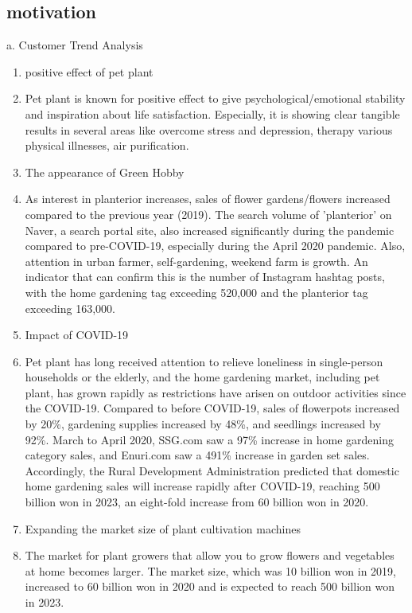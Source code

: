 \documentclass[conference, a4paper]{IEEEtran}
\begin{document}
\subsection{motivation}
a. Customer Trend Analysis
\begin{enumerate}
    \item positive effect of pet plant
    \item[] Pet plant is known for positive effect to give psychological/emotional stability and inspiration about life satisfaction. Especially, it is showing clear tangible results in several areas like overcome stress and depression, therapy various physical illnesses, air purification. \cite{ju2020} \\
    
    \item The appearance of Green Hobby
    \item[] As interest in planterior increases, sales of flower gardens/flowers increased compared to the previous year (2019). The search volume of 'planterior' on Naver, a search portal site, also increased significantly during the pandemic compared to pre-COVID-19, especially during the April 2020 pandemic. Also, attention in urban farmer, self-gardening, weekend farm is growth. An indicator that can confirm this is the number of Instagram hashtag posts, with the home gardening tag exceeding 520,000 and the planterior tag exceeding 163,000. \cite{hanaif_report} \\
    
    \item Impact of COVID-19
    \item[] Pet plant has long received attention to relieve loneliness in single-person households or the elderly, and the home gardening market, including pet plant, has grown rapidly as restrictions have arisen on outdoor activities since the COVID-19.
Compared to before COVID-19, sales of flowerpots increased by 20\%, gardening supplies increased by 48\%, and seedlings increased by 92\%. March to April 2020, SSG.com saw a 97\% increase in home gardening category sales, and Enuri.com saw a 491\% increase in garden set sales.
Accordingly, the Rural Development Administration predicted that domestic home gardening sales will increase rapidly after COVID-19, reaching 500 billion won in 2023, an eight-fold increase from 60 billion won in 2020. \cite{ajunews_article} \\

\item Expanding the market size of plant cultivation machines
\item[] The market for plant growers that allow you to grow flowers and vegetables at home becomes larger. The market size, which was 10 billion won in 2019, increased to 60 billion won in 2020 and is expected to reach 500 billion won in 2023. \cite{spcmagazine_article}
\\


\end{enumerate}
\end{document}
